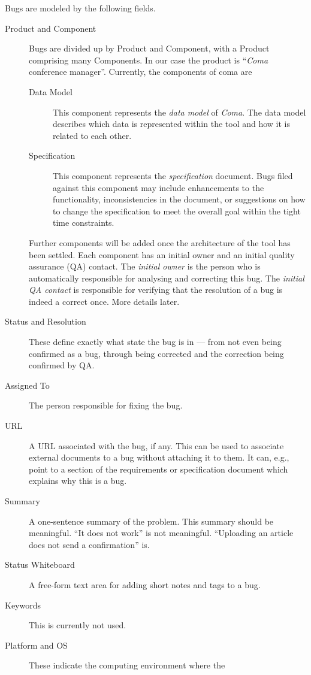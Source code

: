 \documentclass[11pt,nologo,handout]{handout}
\newcommand{\Coma}{\textsl{Coma}}
\begin{document}
Bugs are modeled by the following fields.
\begin{description}
\item[Product and Component]  Bugs are divided up by Product and Component,
  with a Product comprising many Components.  In our case the product is
  ``{\Coma} conference manager''.  Currently, the components of coma are
  \begin{description}
  \item[Data Model]  This component represents the \emph{data model} of
    {\Coma}.  The data model describes which data is represented within
    the tool and how it is related to each other.
  \item[Specification]  This component represents the \emph{specification}
    document.  Bugs filed against this component may include enhancements
    to the functionality, inconsistencies in the document, or suggestions
    on how to change the specification to meet the overall goal within the
    tight time constraints.
  \end{description}
  Further components will be added once the architecture of the tool has
  been settled.  Each component has an initial owner and an
  initial quality assurance (QA) contact.  The \emph{initial owner}
  is the person who is automatically responsible for analysing and
  correcting this bug.  The \emph{initial QA contact} is responsible
  for verifying that the resolution of a bug is indeed a correct once.
  More details later.
\item[Status and Resolution]  These define exactly what state the bug is in
  --- from not even being confirmed as a bug, through being corrected and
  the correction being confirmed by QA.
\item[Assigned To]  The person responsible for fixing the bug.
\item[URL] A URL associated with the bug, if any.  This can be used to
  associate external documents to a bug without attaching it to them.
  It can, e.g., point to a section of the requirements or specification
  document which explains why this is a bug.
\item[Summary] A one-sentence summary of the problem.  This summary should
  be meaningful.  ``It does not work'' is not meaningful.  ``Uploading an
  article does not send a confirmation'' is.
\item[Status Whiteboard]  A free-form text area for adding short notes and
  tags to a bug.
\item[Keywords]  This is currently not used.
\item[Platform and OS]  These indicate the computing environment where the

\end{description}
\end{document}
